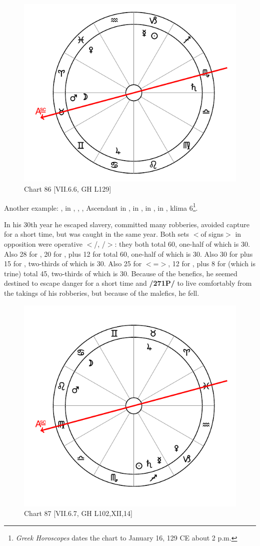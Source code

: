 \newpage
\begin{figure}
\centering
\vspace{0pt}
\includegraphics[width=.68\textwidth]{charts/7_6_06}
\caption{Chart 86 [VII.6.6, GH L129]}
\label{fig:chart86}
\end{figure} 

Another example: \Sun, \Mercury\xspace in \Capricorn, \Moon, \Mars, Ascendant in \Taurus, \Saturn\xspace in \Scorpio, \Jupiter\xspace in \Cancer, \Venus\xspace in \Pisces, klima 6\footnote{\textit{Greek Horoscopes} dates the chart to January 16, 129 CE about 2 p.m.}.

In his 30th year he escaped slavery, committed many robberies, avoided capture for a short time, but was caught in the same year. Both sets $<$of signs$>$ in opposition were operative $<$\Taurus/\Scorpio, \Cancer/\Capricorn$>$: they both total 60, one-half of which is 30. Also 28 for \Capricorn, 20 for \Mercury, plus 12 for \Jupiter\xspace total 60, one-half of which is 30. Also 30 for \Saturn\xspace plus 15 for \Mars, two-thirds of which is 30. Also 25 for \Cancer\xspace $<$=\Moon$>$, 12 for \Jupiter, plus
8 for \Venus\xspace (which is trine) total 45, two-thirds of which is 30. Because of the benefics, he seemed destined to escape danger for a short time and \textbf{/271P/} to live comfortably from the takings of his robberies, but because of the malefics, he fell.

\newpage
\begin{figure}
\centering
\vspace{0pt}
\includegraphics[width=.68\textwidth]{charts/7_6_07}
\caption{Chart 87 [VII.6.7, GH L102,XII,14] }
\label{fig:chart87}
\end{figure} 

